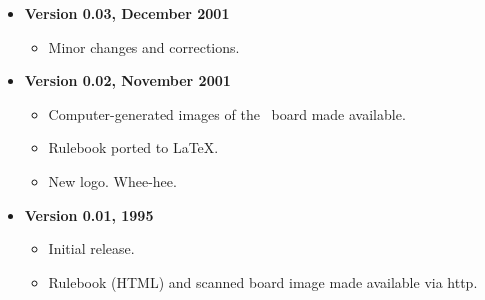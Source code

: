 %

\begin{itemize}
\item {\bf Version 0.03, December 2001}
  \begin{itemize}
  \item Minor changes and corrections.
  \end{itemize}

\item {\bf Version 0.02, November 2001}
  \begin{itemize}
  \item Computer-generated images of the \know\ board made available.
  \item Rulebook ported to \LaTeX.
  \item New logo.  Whee-hee.
  \end{itemize}
  
\item {\bf Version 0.01, 1995}
  \begin{itemize}
  \item Initial release.
  \item Rulebook (HTML) and scanned board image made available via http.
  \end{itemize}
\end{itemize}

%
